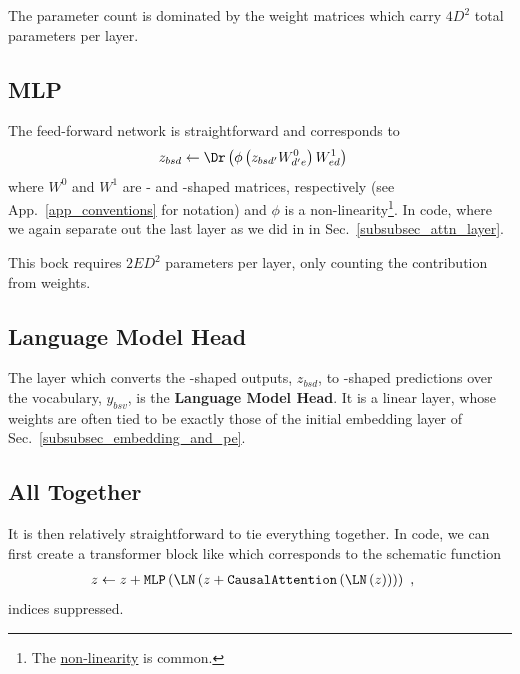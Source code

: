 The parameter count is dominated by the weight matrices which carry $ 4 D ^{ 2 } $ total parameters
per layer.


\subsection{MLP \label{subsubsec_mlp} }

The feed-forward network is straightforward and corresponds to
\begin{align}
	z _{ bsd } & \leftarrow \Dr \left (\phi \left ( z _{ bsd' }W ^{ 0 }_{ d'e } \right ) W ^{ 1 } _{ ed
	} \right ) \label{eq_mlp}
\end{align}
where $ W ^{ 0 } $ and $ W ^{ 1 } $ are - and -shaped matrices,
respectively (see App.~\ref{app_conventions} for notation) and $ \phi $ is a
non-linearity\footnote{The 
	\href{https://pytorch.org/docs/stable/generated/torch.nn.GELU.html}{non-linearity} is common.}.
In code, where we again separate out the last  layer as we did in in
Sec.~\ref{subsubsec_attn_layer}.  

This bock requires $ 2 E D ^{ 2 } $ parameters per layer, only counting the contribution from
weights.


\subsection{Language Model Head \label{subsubsec_language_model_head} }


The layer which converts the -shaped outputs, $ z _{ bsd } $, to -shaped
predictions over the vocabulary, $  y _{ bsv } $, is the \textbf{Language Model Head}. It
is a linear layer, whose weights are often tied to be exactly those of the initial embedding
layer of Sec.~\ref{subsubsec_embedding_and_pe}.


\subsection{All Together}
It is then relatively straightforward to tie everything together.  In code, we can first create a
transformer block like
which corresponds to the schematic function
\begin{align}
	z & \leftarrow  z + \texttt{MLP}\left ( \LN \left ( z + \texttt{CausalAttention}\left ( \LN \left (
				z\right ) \right )  \right ) \right )\ ,
\end{align}
indices suppressed.

